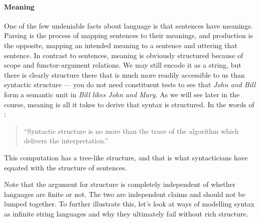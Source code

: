 \paragraph{Meaning}
%
One of the few undeniable facts about language is that sentences have meanings.
Parsing is the process of mapping sentences to their meanings, and production is the opposite, mapping an intended meaning to a sentence and uttering that sentence.
In contrast to sentences, meaning is obviously structured because of scope and functor-argument relations.
We may still encode it as a string, but there is clearly structure there that is much more readily accessible to us than syntactic structure --- you do not need constituent tests to see that \emph{John and Bill} form a semantic unit in \emph{Bill likes John and Mary}.
As we will see later in the course, meaning is all it takes to derive that syntax is structured.
In the words of \citet{Steedman01}:
%
\begin{quote}
    ``Syntactic structure is no more than the trace of the algorithm which delivers the interpretation.''
\end{quote}
%
This computation has a tree-like structure, and that is what syntacticians have equated with the structure of sentences.

Note that the argument for structure is completely independent of whether languages are finite or not.
The two are independent claims and should not be lumped together.
To further illustrate this, let's look at ways of modelling syntax as infinite string languages and why they ultimately fail without rich structure.
